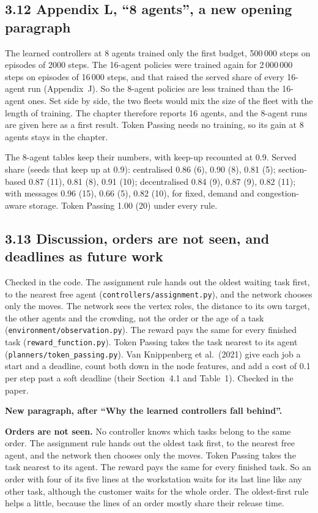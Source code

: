 \documentclass[11pt,a4paper]{article}
\newcommand{\new}[1]{\textcolor{newc}{#1}}
\begin{document}
\subsection*{3.12 Appendix L, ``8 agents'', a new opening paragraph}

\new{The learned controllers at 8 agents trained only the first budget,
500\,000 steps on episodes of 2000 steps. The 16-agent policies were trained
again for 2\,000\,000 steps on episodes of 16\,000 steps, and that raised
the served share of every 16-agent run (Appendix~J). So the 8-agent
policies are less trained than the 16-agent ones. Set side by side, the two
fleets would mix the size of the fleet with the length of training. The
chapter therefore reports 16 agents, and the 8-agent runs are given here as
a first result. Token Passing needs no training, so its gain at 8 agents
stays in the chapter.}

The 8-agent tables keep their numbers, with keep-up recounted at 0.9.
Served share (seeds that keep up at 0.9):
centralised 0.86 (6), 0.90 (8), 0.81 (5); section-based 0.87 (11),
0.81 (8), 0.91 (10); decentralised 0.84 (9), 0.87 (9), 0.82 (11); with
messages 0.96 (15), 0.66 (5), 0.82 (10), for fixed, demand and
congestion-aware storage. Token Passing 1.00 (20) under every rule.

\subsection*{3.13 Discussion, orders are not seen, and deadlines as future work}

Checked in the code. The assignment rule hands out the oldest waiting task
first, to the nearest free agent (\texttt{controllers/assignment.py}), and
the network chooses only the moves. The network sees the vertex roles, the
distance to its own target, the other agents and the crowding, not the
order or the age of a task (\texttt{environment/observation.py}). The reward
pays the same for every finished task (\texttt{reward\_function.py}). Token
Passing takes the task nearest to its agent
(\texttt{planners/token\_passing.py}). Van Knippenberg et al.\ (2021) give
each job a start and a deadline, count both down in the node features, and
add a cost of 0.1 per step past a soft deadline (their Section~4.1 and
Table~1). Checked in the paper.

\textbf{New paragraph, after ``Why the learned controllers fall behind''.}

\new{\textbf{Orders are not seen.} No controller knows which tasks belong to
the same order. The assignment rule hands out the oldest task first, to the
nearest free agent, and the network then chooses only the moves. Token
Passing takes the task nearest to its agent. The reward pays the same for
every finished task. So an order with four of its five lines at the
workstation waits for its last line like any other task, although the
customer waits for the whole order. The oldest-first rule helps a little,
because the lines of an order mostly share their release time.}
\end{document}
